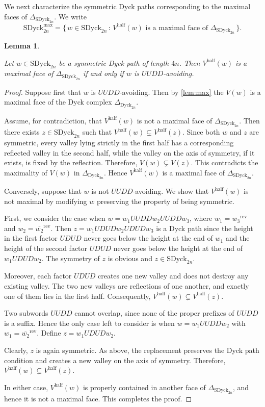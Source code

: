 \documentclass[11pt]{amsart}
\def\Dyck{\mathrm{Dyck}}
\def\half{\mathrm{half}}
\def\SDyck{\mathrm{SDyck}}
\def\rev{\mathrm{rev}}
\theoremstyle{plain}
\newtheorem{lemma}{Lemma}
\numberwithin{lemma}{\DefaultNumberTheoremWithin}
\numberwithin{theorem}{\DefaultNumberTheoremWithin}
\numberwithin{corollary}{\DefaultNumberTheoremWithin}
\numberwithin{proposition}{\DefaultNumberTheoremWithin}
\numberwithin{conjecture}{\DefaultNumberTheoremWithin}
\theoremstyle{definition}
\numberwithin{definition}{\DefaultNumberTheoremWithin}
\numberwithin{question}{\DefaultNumberTheoremWithin}
\numberwithin{problem}{\DefaultNumberTheoremWithin}
\theoremstyle{remark}
\numberwithin{remark}{\DefaultNumberTheoremWithin}
\numberwithin{example}{\DefaultNumberTheoremWithin}
\numberwithin{claim}{\DefaultNumberTheoremWithin}
\begin{document}
We next characterize the symmetric Dyck paths corresponding to
the maximal faces of $\Delta_{\SDyck_{2n}}$. We write
\[
\SDyck_{2n}^{\max}
=
\bigl\{\,
w\in\SDyck_{2n}
\,:\,
V^{\half}(w)\text{ is a maximal face of }
\Delta_{\SDyck_{2n}}
\,\bigr\}.
\]

\begin{lemma} \label{lem:SDyck-max}

Let $w\in\SDyck_{2n}$ be a symmetric Dyck path of length $4n$.
Then $V^{\half}(w)$ is a maximal face of
$\Delta_{\SDyck_{2n}}$ if and only if $w$ is $UUDD$-avoiding.
\end{lemma}

\begin{proof}

Suppose first that $w$ is $UUDD$-avoiding. Then by
\ref{lem:max} the $V(w)$ is a maximal face of the
Dyck complex $\Delta_{\Dyck_{2n}}$.

Assume, for contradiction, that $V^{\half}(w)$ is not a maximal face
of $\Delta_{\SDyck_{2n}}$. Then there exists
$z\in\SDyck_{2n}$ such that
$V^{\half}(w)\subsetneq V^{\half}(z).$
Since both $w$ and $z$ are symmetric, every valley lying strictly
in the first half has a corresponding reflected valley in the
second half, while the valley on the axis of symmetry, if it exists, 
is fixed by the reflection. Therefore,
$V(w)\subsetneq V(z).$
This contradicts the maximality of $V(w)$ in
$\Delta_{\Dyck_{2n}}$. Hence $V^{\half}(w)$ is a maximal face of
$\Delta_{\SDyck_{2n}}$.

Conversely, suppose that $w$ is not $UUDD$-avoiding. We show
that $V^{\half}(w)$ is not maximal by modifying $w$ preserving the
property of being symmetric. 

First, we consider the case when
$w = w_1UUDDw_2UUDDw_3$, where
$w_1 = \overline{w_3}^\rev$ and $w_2 = \overline{w_2}^{\rev}$.
Then $z = w_1UDUDw_2UDUDw_3$ is a Dyck path since the height in the
first factor $UDUD$ never goes below the height at the end of $w_1$ 
and the height of the second factor $UDUD$ never goes below the height at 
the end of $w_1UDUDw_2$. The symmetry of $z$ is obvious and
$z \in \SDyck_{2n}$. 

Moreover, each factor $UDUD$ creates one new valley and does not
destroy any existing valley. The two new valleys are reflections
of one another, and exactly one of them lies in the first half.
Consequently,
$V^{\half}(w)\subsetneq V^{\half}(z).$

Two subwords $UUDD$ cannot overlap, since none of the proper prefixes of $UUDD$ is a suffix. Hence the only case left to consider is
when $w = w_1UUDDw_2$ with $w_1 = \overline{w_2}^{\rev}$. 
Define $z = w_1UDUDw_2$. 


Clearly, $z$ is again symmetric. As above, the
replacement preserves the Dyck path condition and creates a new
valley on the axis of symmetry. Therefore,
$V^{\half}(w)\subsetneq V^{\half}(z).$

In either case, $V^{\half}(w)$ is properly contained in another
face of $\Delta_{\SDyck_{2n}}$, and hence it is not a maximal face. This
completes the proof.
\end{proof}
\end{document}
